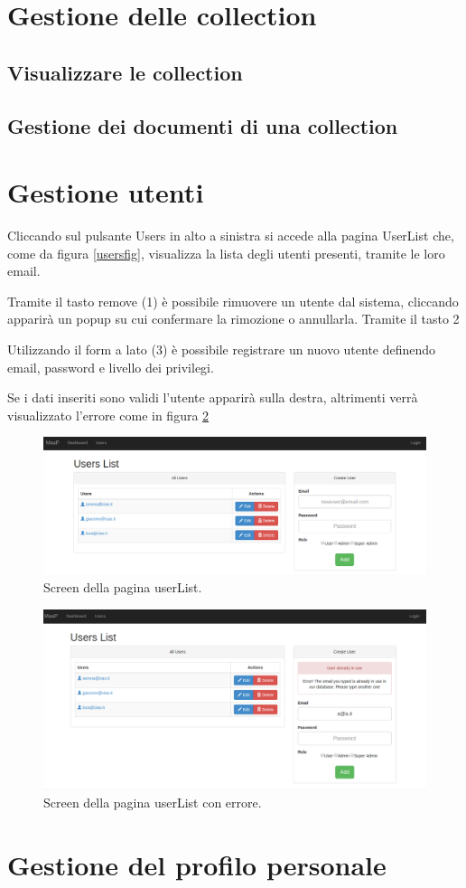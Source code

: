 \section{Gestione delle collection}
\subsection{Visualizzare le collection}
\subsection{Gestione dei documenti di una collection}

\section{Gestione utenti}
\label{nuovoutente}
Cliccando sul pulsante Users in alto a sinistra si accede alla pagina UserList che, come da figura \ref{usersfig}, visualizza la lista degli utenti presenti, tramite le loro email.

Tramite il tasto remove (1) è possibile rimuovere un utente dal sistema, cliccando apparirà un popup su cui confermare la rimozione o annullarla. Tramite il tasto 2 %

Utilizzando il form a lato (3) è possibile registrare un nuovo utente definendo email, password e livello dei privilegi.

Se i dati inseriti sono validi l'utente apparirà sulla destra, altrimenti verrà visualizzato l'errore come in figura \ref{userserrorfig}

\begin{figure}[h]
\label{userslist}
	\centering \includegraphics[width=1\textwidth]{userList.png}
	\caption{Screen della pagina userList.}
\end{figure}

\begin{figure}[h]
\label{userserrorfig}
	\centering \includegraphics[width=1\textwidth]{userListError.png}
	\caption{Screen della pagina userList con errore. }
\end{figure}

\section{Gestione del profilo personale}





